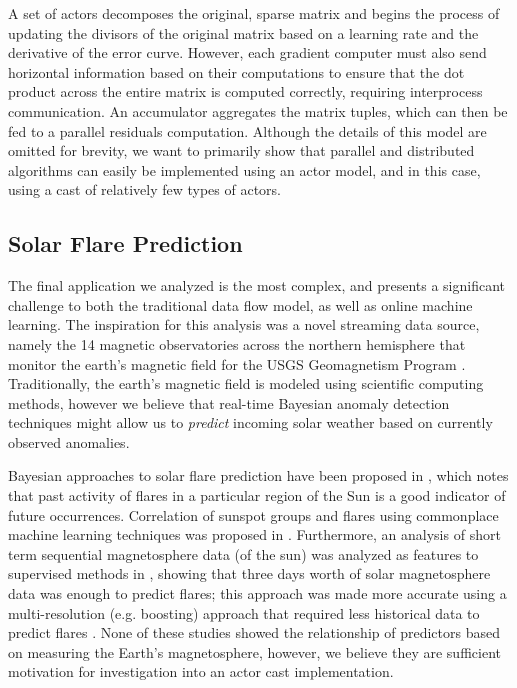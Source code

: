 \documentclass[draftclsnofoot,onecolumn,conference,11pt]{IEEEtran}
\begin{document}
A set of actors decomposes the original, sparse matrix and begins the process of updating the divisors of the original matrix based on a learning rate and the derivative of the error curve. However, each gradient computer must also send horizontal information based on their computations to ensure that the dot product across the entire matrix is computed correctly, requiring interprocess communication. An accumulator aggregates the matrix tuples, which can then be fed to a parallel residuals computation. Although the details of this model are omitted for brevity, we want to primarily show that parallel and distributed algorithms can easily be implemented using an actor model, and in this case, using a cast of relatively few types of actors.

\subsection{Solar Flare Prediction}

The final application we analyzed is the most complex, and presents a significant challenge to both the traditional data flow model, as well as online machine learning. The inspiration for this analysis was a novel streaming data source, namely the 14 magnetic observatories across the northern hemisphere that monitor the earth's magnetic field for the USGS Geomagnetism Program \cite{love_usgs_2011}. Traditionally, the earth's magnetic field is modeled using scientific computing methods, however we believe that real-time Bayesian anomaly detection techniques \cite{hill_real-time_2007} might allow us to \textit{predict} incoming solar weather based on currently observed anomalies.

Bayesian approaches to solar flare prediction have been proposed in \cite{wheatland_bayesian_2004}, which notes that past activity of flares in a particular region of the Sun is a good indicator of future occurrences. Correlation of sunspot groups and flares using commonplace machine learning techniques was proposed in \cite{qahwaji_automatic_2007}. Furthermore, an analysis of short term sequential magnetosphere data (of the sun) was analyzed as features to supervised methods in \cite{yu_short-term_2009}, showing that three days worth of solar magnetosphere data was enough to predict flares; this approach was made more accurate using a multi-resolution (e.g. boosting) approach that required less historical data to predict flares \cite{yu_short-term_2010}. None of these studies showed the relationship of predictors based on measuring the Earth's magnetosphere, however, we believe they are sufficient motivation for investigation into an actor cast implementation.
\end{document}
